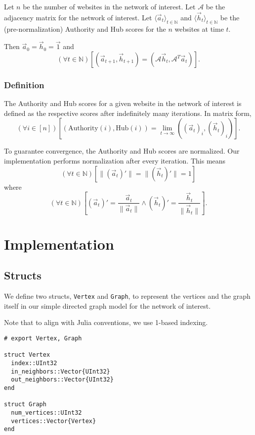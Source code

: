 \documentclass[12pt, titlepage, twoside]{amsart}
\newcommand{\N}{\ensuremath{\mathbb N}}
\begin{document}
Let $n$ be the number of websites in the network of interest.
Let $\mathcal{A}$ be the adjacency matrix for the network of interest.
Let $\langle\vec{a}_t\rangle_{t\in\N}$ and $\langle\vec{h}_t\rangle_{t\in\N}$ be the (pre-normalization)
Authority and Hub scores for the $n$ websites at time $t$.

Then $\vec{a}_0 = \vec{h}_0 = \vec{1}$ and
\[
  (\forall t\in\N)
  \left[
    \left(\vec{a}_{t + 1}, \vec{h}_{t + 1}\right) = \left(\mathcal{A}\vec{h}_t, \mathcal{A}^T\vec{a}_t\right)
  \right].
\]

\subsubsection{Definition} The Authority and Hub scores for a given website in the network of interest is defined
as the respective scores after indefinitely many iterations.
In matrix form,
\[
  (\forall i\in[n])
  \left[
    \left(\mathrm{Authority}(i), \mathrm{Hub}(i)\right) =
    \lim_{t\to\infty}
    \left((\vec{a}_t)_i, (\vec{h}_t)_i\right)
  \right].
\]

To guarantee convergence, the Authority and Hub scores are normalized.
Our implementation performs normalization after every iteration.
This means
\[
  (\forall t\in\N)
  \left[
    \lVert(\vec{a}_t)'\rVert = \lVert(\vec{h}_t)'\rVert = 1
  \right]
\]
where
\[
  (\forall t\in\N)
  \left[
    (\vec{a}_t)' = \frac{\vec{a}_t}{\lVert\vec{a}_t\rVert}
    \wedge
    (\vec{h}_t)' = \frac{\vec{h}_t}{\lVert\vec{h}_t\rVert}
  \right].
\]

\section{Implementation}

\subsection{Structs}

We define two structs, \texttt{Vertex} and \texttt{Graph}, to represent
the vertices and the graph itself in our simple directed graph model for the network of interest.

Note that to align with Julia conventions, we use 1-based indexing.

\begin{verbatim}
# export Vertex, Graph

struct Vertex
  index::UInt32
  in_neighbors::Vector{UInt32}
  out_neighbors::Vector{UInt32}
end

struct Graph
  num_vertices::UInt32
  vertices::Vector{Vertex}
end
\end{verbatim}
\end{document}
